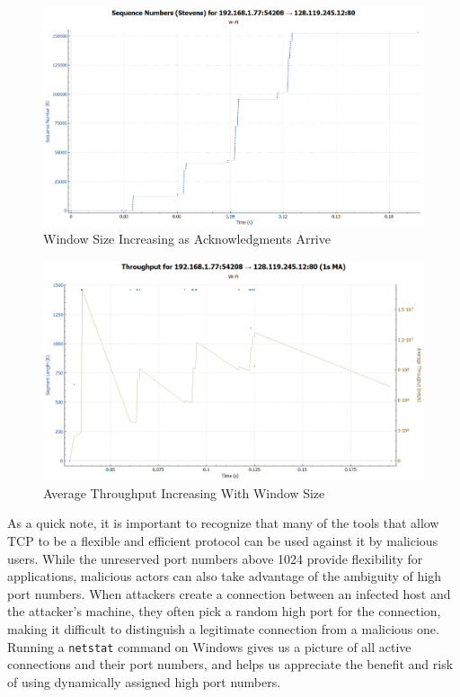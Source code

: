 \documentclass[10pt]{IEEEtran}
\begin{document}
   \begin{figure}[h!]
 \includegraphics[width=\linewidth]{increasingwindow.png}
 \caption{Window Size Increasing as Acknowledgments Arrive}
 \label{fig:increasingwindow}
 \end{figure}
 
 \begin{figure}[h!]
 \includegraphics[width=\linewidth]{tcpthroughput.png}
 \caption{Average Throughput Increasing With Window Size}
 \label{fig:tcpthroughput}
 \end{figure}
 
 As a quick note, it is important to recognize that many of the tools that allow TCP to be a flexible and efficient protocol can be used against it by malicious users. While the unreserved port numbers above 1024 provide flexibility for applications, malicious actors can also take advantage of the ambiguity of high port numbers. When attackers create a connection between an infected host and the attacker's machine, they often pick a random high port for the connection, making it difficult to distinguish a legitimate connection from a malicious one. Running a {\tt netstat} command on Windows gives us a picture of all active connections and their port numbers, and helps us appreciate the benefit and risk of using dynamically assigned high port numbers.
 
\end{document}
